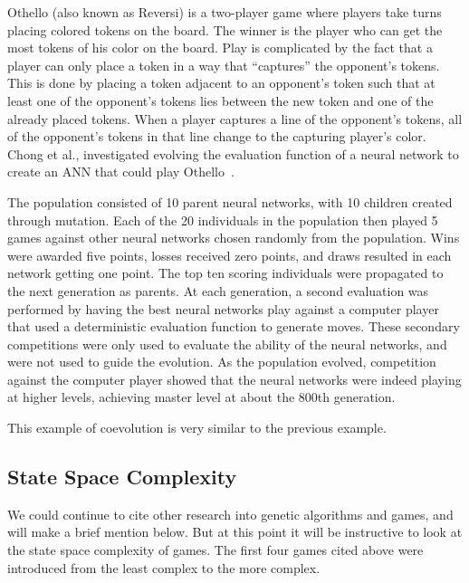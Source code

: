 Othello (also known as Reversi) is a two-player game where players take turns
placing colored tokens on the board. The winner is the player who can get the
most tokens of his color on the board. Play is complicated by the fact that a
player can only place a token in a way that ``captures'' the opponent's tokens.
This is done by placing a token adjacent to an opponent's token such that at
least one of the opponent's tokens lies between the new token and one of the
already placed tokens. When a player captures a line of the opponent's tokens,
all of the opponent's tokens in that line change to the capturing player's
color. Chong et al., investigated evolving the evaluation function of a neural
network to create an ANN that could play Othello~\cite{ChongTW05}.

The population consisted of 10 parent neural networks, with 10 children created
through mutation. Each of the 20 individuals in the population then played 5
games against other neural networks chosen randomly from the population. Wins
were awarded five points, losses received zero points, and draws resulted in
each network getting one point. The top ten scoring individuals were propagated
to the next generation as parents. At each generation, a second evaluation was
performed by having the best neural networks play against a computer player that
used a deterministic evaluation function to generate moves. These secondary
competitions were only used to evaluate the ability of the neural networks, and
were not used to guide the evolution. As the population evolved, competition
against the computer player showed that the neural networks were indeed playing
at higher levels, achieving master level at about the 800th generation.

This example of coevolution is very similar to the previous example.

\subsection{State Space Complexity}
We could continue to cite other research into genetic algorithms and games, and
will make a brief mention below. But at this point it will be instructive to
look at the state space complexity of games. The first four games cited above
were introduced from the least complex to the more complex.

